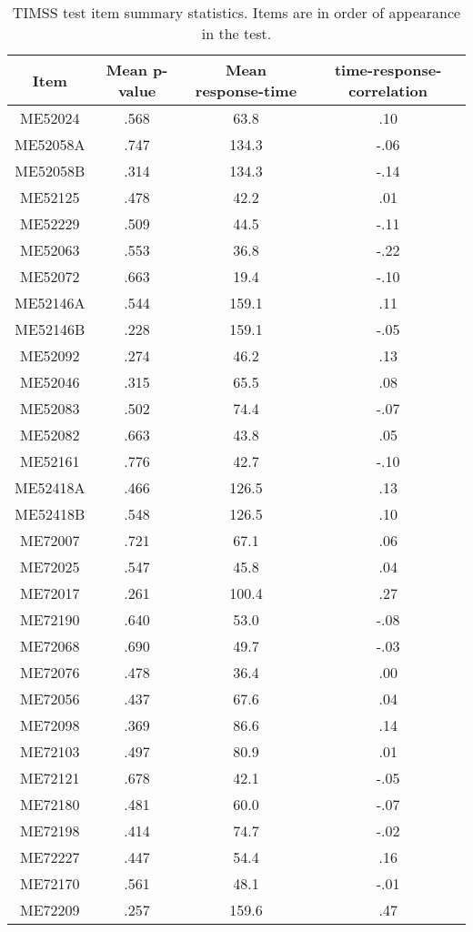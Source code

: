 \documentclass{interact}
\begin{document}
\begin{table} [p]
\Centering
\caption{\label{tab:item_summ}\\ TIMSS test item summary statistics. Items are in order of appearance in the test.}
\begin{tabular}{c|c c c}
\hline
    Item & Mean p-value & Mean response-time & time-response-correlation \\
    \hline
    ME52024 & .568 & 63.8 & .10\\
    ME52058A & .747 & 134.3 & -.06\\
    ME52058B & .314 & 134.3 & -.14\\
    ME52125 & .478 & 42.2 & .01\\
    ME52229 & .509 & 44.5 & -.11\\
    ME52063 & .553 & 36.8 & -.22\\
    ME52072 & .663 & 19.4 & -.10\\
    ME52146A & .544 & 159.1 & .11\\
    ME52146B & .228 & 159.1 & -.05\\
    ME52092 & .274 & 46.2 & .13\\
    ME52046 & .315 & 65.5 & .08\\
    ME52083 & .502 & 74.4 & -.07\\
    ME52082 & .663 & 43.8 & .05\\
    ME52161 & .776 & 42.7 & -.10\\
    ME52418A & .466 & 126.5 & .13\\
    ME52418B & .548 & 126.5 & .10\\
    ME72007 & .721 & 67.1 & .06\\
    ME72025 & .547 & 45.8 & .04\\
    ME72017 & .261 & 100.4 & .27\\
    ME72190 & .640 & 53.0 & -.08\\
    ME72068 & .690 & 49.7 & -.03\\
    ME72076 & .478 & 36.4 & .00\\
    ME72056 & .437 & 67.6 & .04\\
    ME72098 & .369 & 86.6 & .14\\
    ME72103 & .497 & 80.9 & .01\\
    ME72121 & .678 & 42.1 & -.05\\
    ME72180 & .481 & 60.0 & -.07\\
    ME72198 & .414 & 74.7 & -.02\\
    ME72227 & .447 & 54.4 & .16\\
    ME72170 & .561 & 48.1 & -.01\\
    ME72209 & .257 & 159.6 & .47\\
    \hline
\end{tabular}
\end{table}
\end{document}
